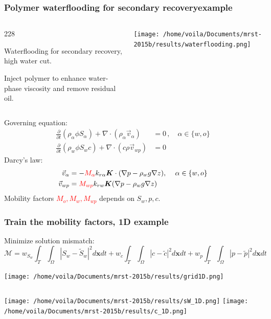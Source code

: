 \documentclass{beamer}
\newcommand{\barrow}{\item[\color{darkred}\ding{228}]}
\begin{document}
\begin{frame}
    \frametitle{Polymer waterflooding for secondary recovery\hfill \scriptsize{example}}\small
    \begin{columns}
        \begin{dinglist}{228}
            \barrow Waterflooding for secondary recovery, high water cut.
            \barrow Inject polymer to enhance water-phase viscosity and remove residual oil.
        \end{dinglist}
        \begin{center}
            \texttt{[image: /home/voila/Documents/mrst-2015b/results/waterflooding.png]}
        \end{center}
    \end{columns}
    Governing equation:
    \begin{equation*}\begin{split}
        \frac{\partial }{\partial t} \left(\rho_\alpha \phi S_\alpha \right) + \nabla \cdot
        \left( \rho_\alpha \vec{v}_{\alpha} \right) &= 0\,, \quad \alpha \in \{w,o\}\\
        \frac{\partial}{\partial t}\left( \rho_w \phi S_w c \right) + \nabla \cdot
        \left( c \rho \vec{v}_{wp}\right) &= 0        
    \end{split}\end{equation*}
    Darcy's law:
    \begin{equation*}\begin{split}
        \vec{v}_\alpha &= - \textcolor{red}{M_\alpha} k_{r\alpha} \boldsymbol{K} \cdot (\nabla p - \rho_w g \nabla z), \, \quad \alpha \in \{w,o\}\\
        \vec{v}_{wp} &= \textcolor{red}{M_{wp}} k_{rw} \boldsymbol{K} (\nabla p - \rho_{w} g \nabla z)
    \end{split}\end{equation*}
    \vspace{.1cm}
    Mobility factors \textcolor{red}{$M_o, M_w, M_{wp}$} depends on $S_w, p, c$. 
\end{frame}

\begin{frame}
    \frametitle{Train the mobility factors, 1D \hfill \scriptsize{example}}\small
    Minimize solution mismatch:
    $$
        \mathcal{M} = w_{S_w}\int_T\int_\Omega |S_w-\tilde{S}_w|^2 d\boldsymbol{x} dt
                    + w_{c}\int_T\int_\Omega |c-\tilde{c}|^2 d\boldsymbol{x} dt 
                    + w_{p}\int_T\int_\Omega |p-\tilde{p}|^2 d\boldsymbol{x} dt
    $$
    \begin{center}
        \texttt{[image: /home/voila/Documents/mrst-2015b/results/grid1D.png]}
    \end{center}
    \begin{columns}
        \centering
        \texttt{[image: /home/voila/Documents/mrst-2015b/results/sW\_1D.png]}
        \centering
        \texttt{[image: /home/voila/Documents/mrst-2015b/results/c\_1D.png]}
    \end{columns}
\end{frame}
\end{document}
